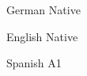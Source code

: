 \smallskip

\smallskip


German \hfill Native
\smallskip

English \hfill Native
\smallskip

Spanish \hfill A1

\medskip


